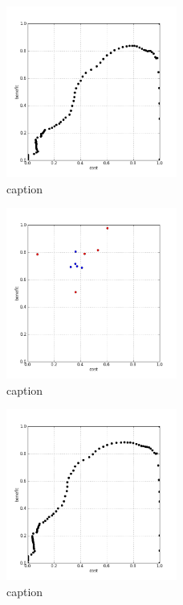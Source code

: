 %
\begin{figure}[!ht]
	\centering
	\includegraphics[width=0.5\textwidth]{img/p1figs/computeFrameStateContrastOnly_sectionCompareBetter_smooth0_tol12_AUC.png}
	\caption{caption}
\end{figure}
%
\begin{figure}[!ht]
	\centering
	\includegraphics[width=0.5\textwidth]{img/p1figs/computeFrameStateContrastOnly_sectionCompareBetter_smooth0_tol24.png}
	\caption{caption}
\end{figure}
%
\begin{figure}[!ht]
	\centering
	\includegraphics[width=0.5\textwidth]{img/p1figs/computeFrameStateContrastOnly_sectionCompareBetter_smooth0_tol24_AUC.png}
	\caption{caption}
\end{figure}
